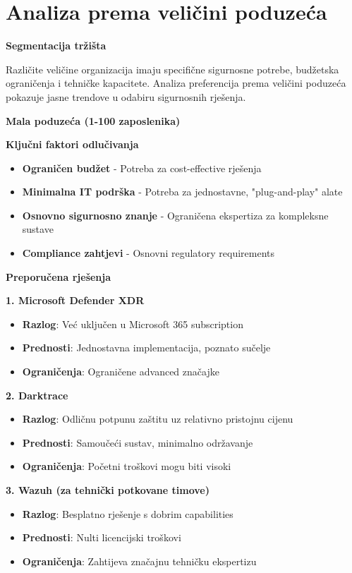 \chapter{Analiza prema veličini poduzeća}

\textbf{Segmentacija tržišta}

Različite veličine organizacija imaju specifične sigurnosne potrebe, budžetska ograničenja i tehničke kapacitete. Analiza preferencija prema veličini poduzeća pokazuje jasne trendove u odabiru sigurnosnih rješenja.

\textbf{Mala poduzeća (1-100 zaposlenika)}

\textbf{Ključni faktori odlučivanja}
\begin{itemize}
\item \textbf{Ograničen budžet} - Potreba za cost-effective rješenja
\item \textbf{Minimalna IT podrška} - Potreba za jednostavne, "plug-and-play" alate
\item \textbf{Osnovno sigurnosno znanje} - Ograničena ekspertiza za kompleksne sustave
\item \textbf{Compliance zahtjevi} - Osnovni regulatory requirements
\end{itemize}

\textbf{Preporučena rješenja}

\textbf{1. Microsoft Defender XDR}
\begin{itemize}
\item \textbf{Razlog}: Već uključen u Microsoft 365 subscription
\item \textbf{Prednosti}: Jednostavna implementacija, poznato sučelje
\item \textbf{Ograničenja}: Ograničene advanced značajke
\end{itemize}

\textbf{2. Darktrace}
\begin{itemize}
\item \textbf{Razlog}: Odličnu potpunu zaštitu uz relativno pristojnu cijenu
\item \textbf{Prednosti}: Samoučeći sustav, minimalno održavanje
\item \textbf{Ograničenja}: Početni troškovi mogu biti visoki
\end{itemize}

\textbf{3. Wazuh (za tehnički potkovane timove)}
\begin{itemize}
\item \textbf{Razlog}: Besplatno rješenje s dobrim capabilities
\item \textbf{Prednosti}: Nulti licencijski troškovi
\item \textbf{Ograničenja}: Zahtijeva značajnu tehničku ekspertizu
\end{itemize}


